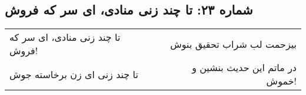 \begin{center}
\section*{شماره ۲۳: تا چند زنی منادی، ای سر که فروش}
\label{sec:023}
\begin{longtable}{l p{0.5cm} r}
تا چند زنی منادی، ای سر که فروش!
&&
بیزحمت لب شراب تحقیق بنوش
\\
تا چند زنی ای زن برخاسته جوش
&&
در ماتم این حدیث بنشین و خموش!
\\
\end{longtable}
\end{center}
